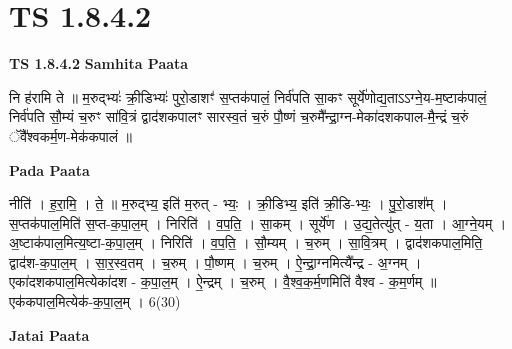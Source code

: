 \documentclass[17pt]{extarticle}
\begin{document}
\section*{ TS 1.8.4.2 }

\textbf{TS 1.8.4.2 } \newline
\textbf{Samhita Paata} \newline

नि ह॑रामि ते ॥ म॒रुद्भ्यः॑ क्री॒डिभ्यः॑ पुरो॒डाशꣳ॑ स॒प्तक॑पालं॒ निर्व॑पति सा॒कꣳ सूर्ये॑णोद्य॒ताऽऽग्ने॒य-म॒ष्टाक॑पालं॒ निर्व॑पति सौ॒म्यं च॒रुꣳ सा॑वि॒त्रं द्वाद॑शकपालꣳ सारस्व॒तं च॒रुं पौ॒ष्णं च॒रुमै᳚न्द्रा॒ग्न-मेका॑दशकपाल-मै॒न्द्रं च॒रुं ॅवै᳚श्वकर्म॒ण-मेक॑कपालं ॥ \newline

\textbf{Pada Paata} \newline

नीति॑ । ह॒रा॒मि॒ । ते॒ ॥ म॒रुद्भ्य॒ इति॑ म॒रुत् - भ्यः॒ । क्री॒डिभ्य॒ इति॑ क्री॒डि-भ्यः॒ । पु॒रो॒डाश᳚म् । स॒प्तक॑पाल॒मिति॑ स॒प्त-क॒पा॒ल॒म् । निरिति॑ । व॒प॒ति॒ । सा॒कम् । सूर्ये॑ण । उ॒द्य॒तेत्यु॑त् - य॒ता । आ॒ग्ने॒यम् । अ॒ष्टाक॑पाल॒मित्य॒ष्टा-क॒पा॒ल॒म् । निरिति॑ । व॒प॒ति॒ । सौ॒म्यम् । च॒रुम् । सा॒वि॒त्रम् । द्वाद॑शकपाल॒मिति॒ द्वाद॑श-क॒पा॒ल॒म् । सा॒र॒स्व॒तम् । च॒रुम् । पौ॒ष्णम् । च॒रुम् । ऐ॒न्द्रा॒ग्नमित्यै᳚न्द्र - अ॒ग्नम् । एका॑दशकपाल॒मित्येका॑दश - क॒पा॒ल॒म् । ऐ॒न्द्रम् । च॒रुम् । वै॒श्व॒क॒र्म॒णमिति॑ वैश्व - क॒म॒र्णम् ॥ एक॑कपाल॒मित्येक॑-क॒पा॒ल॒म् । 6(30)  \newline



\textbf{Jatai Paata} \newline
\end{document}
